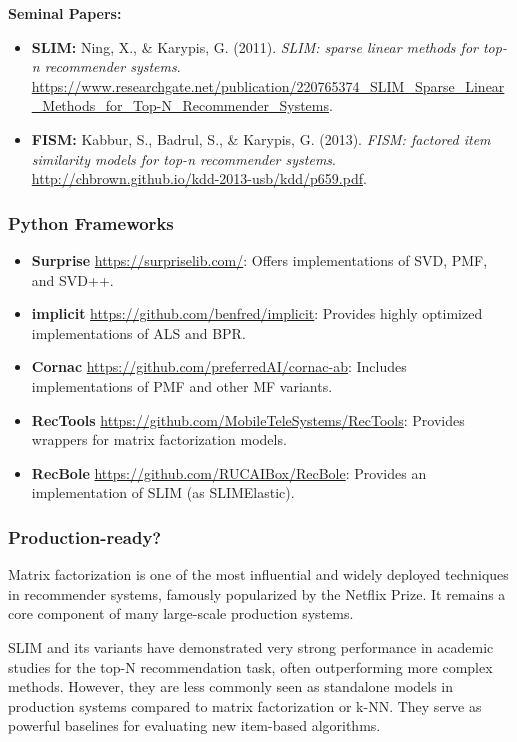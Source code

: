 \documentclass{article}
\begin{document}
\noindent\textbf{Seminal Papers:}
    \begin{itemize}
        \item \textbf{SLIM:} Ning, X., \& Karypis, G. (2011). \textit{SLIM: sparse linear methods for top-n recommender systems}. \url{https://www.researchgate.net/publication/220765374_SLIM_Sparse_Linear_Methods_for_Top-N_Recommender_Systems}.
        \item \textbf{FISM:} Kabbur, S., Badrul, S., \& Karypis, G. (2013). \textit{FISM: factored item similarity models for top-n recommender systems}. \url{http://chbrown.github.io/kdd-2013-usb/kdd/p659.pdf}.
    \end{itemize}
    
    \subsubsection*{Python Frameworks}
    \begin{itemize}
        \item \textbf{Surprise} \url{https://surpriselib.com/}: Offers implementations of SVD, PMF, and SVD++.
        \item \textbf{implicit} \url{https://github.com/benfred/implicit}: Provides highly optimized implementations of ALS and BPR.
        \item \textbf{Cornac} \url{https://github.com/preferredAI/cornac-ab}: Includes implementations of PMF and other MF variants.
        \item \textbf{RecTools} \url{https://github.com/MobileTeleSystems/RecTools}: Provides wrappers for matrix factorization models.
        \item \textbf{RecBole} \url{https://github.com/RUCAIBox/RecBole}: Provides an implementation of SLIM (as SLIMElastic).
    \end{itemize}

    \subsubsection*{Production-ready?}
    Matrix factorization is one of the most influential and widely deployed techniques in recommender systems, famously popularized by the Netflix Prize. It remains a core component of many large-scale production systems.

    SLIM and its variants have demonstrated very strong performance in academic studies for the top-N recommendation task, often outperforming more complex methods. However, they are less commonly seen as standalone models in production systems compared to matrix factorization or k-NN. They serve as powerful baselines for evaluating new item-based algorithms.
    
\end{document}
